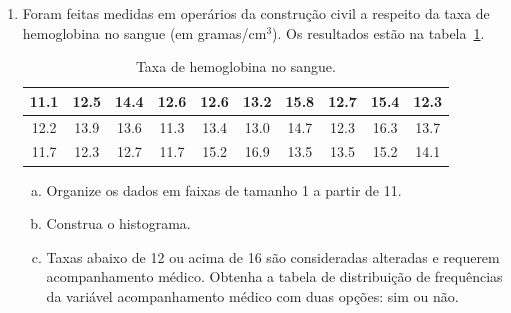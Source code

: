 \documentclass[12pt, a4paper]{article}
\begin{document}
\begin{enumerate}[1-]
	\item Foram feitas medidas em operários da construção civil a respeito da taxa de hemoglobina no sangue (em gramas/cm$^3$). Os resultados estão na tabela~\ref{tab:exe4}.
	\begin{table}[ht]
	\centering
	\begin{tabular}{c|c|c|c|c|c|c|c|c|c}
	  \toprule[0.05cm]
	11.1 & 12.5 & 14.4 & 12.6 & 12.6 & 13.2 & 15.8 & 12.7 & 15.4 & 12.3 \\ \midrule
	  12.2 & 13.9 & 13.6 & 11.3 & 13.4 & 13.0 & 14.7 & 12.3 & 16.3 & 13.7 \\ \midrule
	  11.7 & 12.3 & 12.7 & 11.7 & 15.2 & 16.9 & 13.5 & 13.5 & 15.2 & 14.1 \\ 
	  \bottomrule[0.05cm]
	\end{tabular}
	\caption{Taxa de hemoglobina no sangue.} 
	\label{tab:exe4}
	\end{table}
	\begin{enumerate}[(a)]
	 \item Organize os dados em faixas de tamanho 1 a partir de 11.
	 \item Construa o histograma.
	 \item Taxas abaixo de 12 ou acima de 16 são consideradas alteradas e requerem acompanhamento médico. Obtenha a tabela de distribuição de frequências da variável acompanhamento médico com duas opções: sim ou não.
	\end{enumerate}


\end{enumerate}
\end{document}

